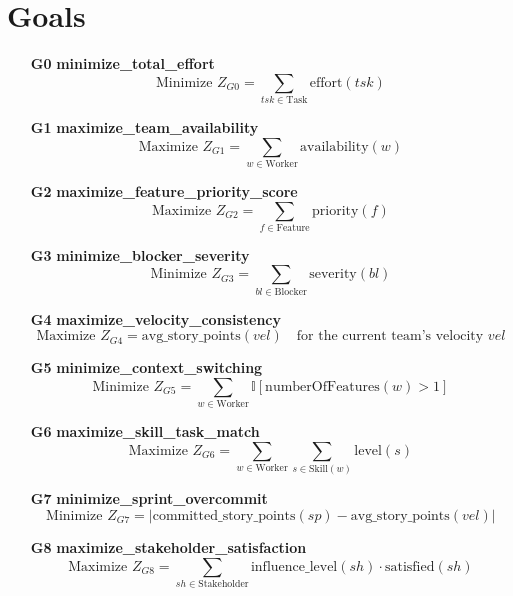 \documentclass[11pt]{article}
\begin{document}
\section{Goals}
\begin{itemize}
    \item[\textbf{G0}] \textbf{minimize\_total\_effort}
    \[ \text{Minimize } Z_{G0} = \sum_{tsk \in \text{Task}} \text{effort}(tsk) \]
    
    \item[\textbf{G1}] \textbf{maximize\_team\_availability}
    \[ \text{Maximize } Z_{G1} = \sum_{w \in \text{Worker}} \text{availability}(w) \]
    
    \item[\textbf{G2}] \textbf{maximize\_feature\_priority\_score}
    \[ \text{Maximize } Z_{G2} = \sum_{f \in \text{Feature}} \text{priority}(f) \]
    
    \item[\textbf{G3}] \textbf{minimize\_blocker\_severity}
    \[ \text{Minimize } Z_{G3} = \sum_{bl \in \text{Blocker}} \text{severity}(bl) \]
    
    \item[\textbf{G4}] \textbf{maximize\_velocity\_consistency}
    \[ \text{Maximize } Z_{G4} = \text{avg\_story\_points}(vel) \quad \text{for the current team's velocity } vel \]
    
    \item[\textbf{G5}] \textbf{minimize\_context\_switching}
    \[ \text{Minimize } Z_{G5} = \sum_{w \in \text{Worker}} \mathbb{I}[\text{numberOfFeatures}(w) > 1] \]
    
    \item[\textbf{G6}] \textbf{maximize\_skill\_task\_match}
    \[ \text{Maximize } Z_{G6} = \sum_{w \in \text{Worker}} \sum_{s \in \text{Skill}(w)} \text{level}(s) \]
    
    \item[\textbf{G7}] \textbf{minimize\_sprint\_overcommit}
    \[ \text{Minimize } Z_{G7} = | \text{committed\_story\_points}(sp) - \text{avg\_story\_points}(vel) | \]
    
    \item[\textbf{G8}] \textbf{maximize\_stakeholder\_satisfaction}
    \[ \text{Maximize } Z_{G8} = \sum_{sh \in \text{Stakeholder}} \text{influence\_level}(sh) \cdot \text{satisfied}(sh) \]
\end{itemize}
\end{document}
